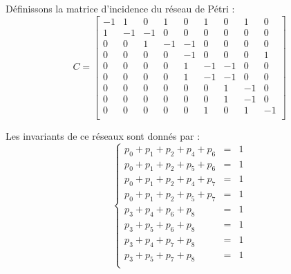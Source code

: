 Définissons la matrice d'incidence du réseau de Pétri : \[
    C = \left [
    \begin{array}{ccccccccc}
        -1 &  1 &  0 &  1 &  0 &  1 &  0 &  1 &  0 \\
         1 & -1 & -1 &  0 &  0 &  0 &  0 &  0 &  0 \\
         0 &  0 &  1 & -1 & -1 &  0 &  0 &  0 &  0 \\
         0 &  0 &  0 &  0 & -1 &  0 &  0 &  0 &  1 \\
         0 &  0 &  0 &  0 &  1 & -1 & -1 &  0 &  0 \\
         0 &  0 &  0 &  0 &  1 & -1 & -1 &  0 &  0 \\
         0 &  0 &  0 &  0 &  0 &  0 &  1 & -1 &  0 \\
         0 &  0 &  0 &  0 &  0 &  0 &  1 & -1 &  0 \\
         0 &  0 &  0 &  0 &  0 &  1 &  0 &  1 & -1 \\
    \end{array}
    \right ]
\]

\begin{thrm}
    Les invariants de ce réseaux sont donnés par : \[
        \left \lbrace \begin{array}{rcl}
            p_0 + p_1 + p_2 + p_4 + p_6 & = & 1\\
            p_0 + p_1 + p_2 + p_5 + p_6 & = & 1\\
            p_0 + p_1 + p_2 + p_4 + p_7 & = & 1\\
            p_0 + p_1 + p_2 + p_5 + p_7 & = & 1\\
            p_3 + p_4 + p_6 + p_8       & = & 1\\
            p_3 + p_5 + p_6 + p_8       & = & 1\\
            p_3 + p_4 + p_7 + p_8       & = & 1\\
            p_3 + p_5 + p_7 + p_8       & = & 1\\
        \end{array} \right .
    \]
\end{thrm}

